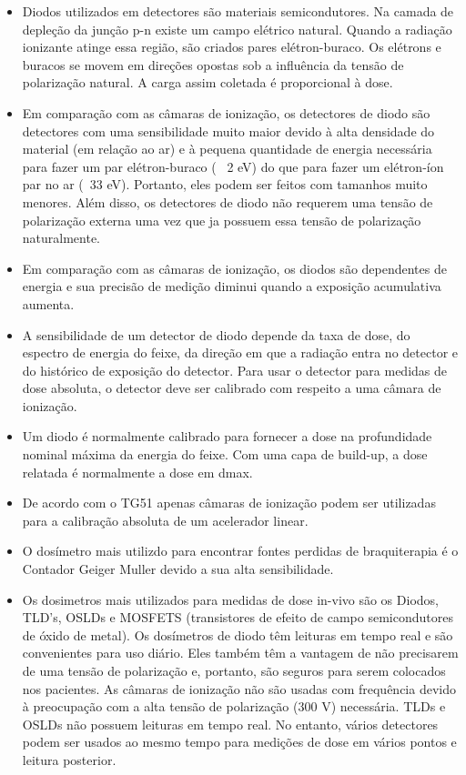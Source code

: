 \documentclass[11pt,a4paper]{article}
\newcounter{exemplo}
\begin{document}
\begin{exemplo}
\begin{itemize}
        \item Diodos utilizados em detectores são materiais semicondutores. Na camada de depleção da junção p-n existe um campo elétrico natural. Quando a radiação ionizante atinge essa região, são criados pares elétron-buraco. Os elétrons e buracos se movem em direções opostas sob a influência da tensão de polarização natural. A carga assim coletada é proporcional à dose.
        
        \item Em comparação com as câmaras de ionização, os detectores de diodo são detectores com uma sensibilidade muito maior devido à alta densidade do material (em relação ao ar) e à pequena quantidade de energia necessária para fazer um par elétron-buraco (~ 2 eV) do que para fazer um elétron-íon par no ar (~33 eV). Portanto, eles podem ser feitos com tamanhos muito menores. Além disso, os detectores de diodo não requerem uma tensão de polarização externa uma vez que ja possuem essa tensão de polarização naturalmente. 
        
        \item Em comparação com as câmaras de ionização, os diodos são dependentes de energia e sua precisão de medição diminui quando a exposição acumulativa aumenta.
        
        \item A sensibilidade de um detector de diodo depende da taxa de dose, do espectro de energia do feixe, da direção em que a radiação entra no detector e do histórico de exposição do detector. Para usar o detector para medidas de dose absoluta, o detector deve ser calibrado com respeito a uma câmara de ionização.
        
        \item Um diodo é normalmente calibrado para fornecer a dose na profundidade nominal máxima da energia do feixe. Com uma capa de build-up, a dose relatada é normalmente a dose em dmax.
        
        \item De acordo com o TG51 apenas câmaras de ionização podem ser utilizadas para a calibração absoluta de um acelerador linear.
        
        \item O dosímetro mais utilizdo para encontrar fontes perdidas de braquiterapia é o Contador Geiger Muller devido a sua alta sensibilidade.
        
        \item Os dosimetros mais utilizados para medidas de dose in-vivo são os Diodos, TLD's, OSLDs e MOSFETS (transistores de efeito de campo semicondutores de óxido de metal).  Os dosímetros de diodo têm leituras em tempo real e são convenientes para uso diário. Eles também têm a vantagem de não precisarem de uma tensão de polarização e, portanto, são seguros para serem colocados nos pacientes. As câmaras de ionização não são usadas com frequência devido à preocupação com a alta tensão de polarização (300 V) necessária. TLDs e OSLDs não possuem leituras em tempo real. No entanto, vários detectores podem ser usados ao mesmo tempo para medições de dose em vários pontos e leitura posterior.
        

\end{itemize}
\end{exemplo}
\end{document}
